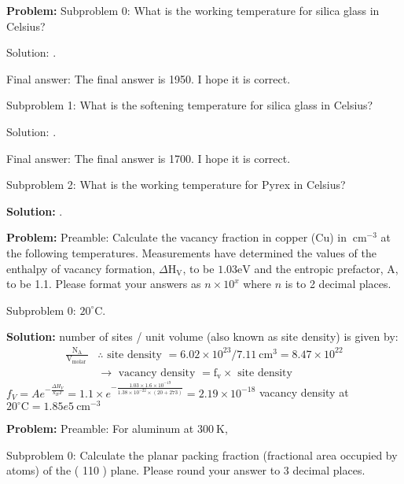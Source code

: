 \documentclass[10pt]{article}
\begin{document}
\textbf{Problem:}
Subproblem 0: What is the working temperature for silica glass in Celsius?


Solution: .

Final answer: The final answer is 1950. I hope it is correct.

Subproblem 1: What is the softening temperature for silica glass in Celsius?


Solution: .

Final answer: The final answer is 1700. I hope it is correct.

Subproblem 2: What is the working temperature for Pyrex in Celsius?


\textbf{Solution:}
.


\textbf{Problem:}
Preamble: Calculate the vacancy fraction in copper (Cu) in $\mathrm{~cm}^{-3}$ at the following temperatures. Measurements have determined the values of the enthalpy of vacancy formation, $\Delta \mathrm{H}_{\mathrm{V}}$, to be $1.03 \mathrm{eV}$ and the entropic prefactor, A, to be 1.1. Please format your answers as $n \times 10^x$ where $n$ is to 2 decimal places.

Subproblem 0: $20^{\circ} \mathrm{C}$. 


\textbf{Solution:}
number of sites / unit volume (also known as site density) is given by:
\[
\begin{aligned}
\frac{\mathrm{N}_{\mathrm{A}}}{\mathrm{V}_{\text {molar }}} & \therefore \text { site density }=6.02 \times 10^{23} / 7.11 \mathrm{~cm}^{3}=8.47 \times 10^{22} \\
& \rightarrow \text { vacancy density }=\mathrm{f}_{\mathrm{v}} \times \text { site density }
\end{aligned}
\]
$f_{V}=A e^{-\frac{\Delta H_{V}}{k_{B} T}}=1.1 \times e^{-\frac{1.03 \times 1.6 \times 10^{-19}}{1.38 \times 10^{-22} \times(20+273)}}=2.19 \times 10^{-18}$
vacancy density at $20^{\circ} \mathrm{C}= \boxed{1.85e5} \mathrm{~cm}^{-3}$


\textbf{Problem:}
Preamble: For aluminum at $300 \mathrm{~K}$, 

Subproblem 0: Calculate the planar packing fraction (fractional area occupied by atoms) of the ( 110 ) plane. Please round your answer to 3 decimal places. 
\end{document}

